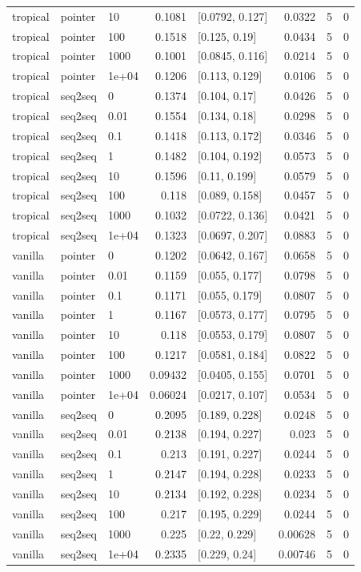 \documentclass[10pt]{article}
\begin{document}
{\begin{longtable}{lllrlrrr}
tropical & pointer & 10 & 0.1081 & [0.0792, 0.127] & 0.0322 & 5 & 0\\
tropical & pointer & 100 & 0.1518 & [0.125, 0.19] & 0.0434 & 5 & 0\\
tropical & pointer & 1000 & 0.1001 & [0.0845, 0.116] & 0.0214 & 5 & 0\\
tropical & pointer & 1e+04 & 0.1206 & [0.113, 0.129] & 0.0106 & 5 & 0\\
tropical & seq2seq & 0 & 0.1374 & [0.104, 0.17] & 0.0426 & 5 & 0\\
tropical & seq2seq & 0.01 & 0.1554 & [0.134, 0.18] & 0.0298 & 5 & 0\\
tropical & seq2seq & 0.1 & 0.1418 & [0.113, 0.172] & 0.0346 & 5 & 0\\
tropical & seq2seq & 1 & 0.1482 & [0.104, 0.192] & 0.0573 & 5 & 0\\
tropical & seq2seq & 10 & 0.1596 & [0.11, 0.199] & 0.0579 & 5 & 0\\
tropical & seq2seq & 100 & 0.118 & [0.089, 0.158] & 0.0457 & 5 & 0\\
tropical & seq2seq & 1000 & 0.1032 & [0.0722, 0.136] & 0.0421 & 5 & 0\\
tropical & seq2seq & 1e+04 & 0.1323 & [0.0697, 0.207] & 0.0883 & 5 & 0\\
vanilla & pointer & 0 & 0.1202 & [0.0642, 0.167] & 0.0658 & 5 & 0\\
vanilla & pointer & 0.01 & 0.1159 & [0.055, 0.177] & 0.0798 & 5 & 0\\
vanilla & pointer & 0.1 & 0.1171 & [0.055, 0.179] & 0.0807 & 5 & 0\\
vanilla & pointer & 1 & 0.1167 & [0.0573, 0.177] & 0.0795 & 5 & 0\\
vanilla & pointer & 10 & 0.118 & [0.0553, 0.179] & 0.0807 & 5 & 0\\
vanilla & pointer & 100 & 0.1217 & [0.0581, 0.184] & 0.0822 & 5 & 0\\
vanilla & pointer & 1000 & 0.09432 & [0.0405, 0.155] & 0.0701 & 5 & 0\\
vanilla & pointer & 1e+04 & 0.06024 & [0.0217, 0.107] & 0.0534 & 5 & 0\\
vanilla & seq2seq & 0 & 0.2095 & [0.189, 0.228] & 0.0248 & 5 & 0\\
vanilla & seq2seq & 0.01 & 0.2138 & [0.194, 0.227] & 0.023 & 5 & 0\\
vanilla & seq2seq & 0.1 & 0.213 & [0.191, 0.227] & 0.0244 & 5 & 0\\
vanilla & seq2seq & 1 & 0.2147 & [0.194, 0.228] & 0.0233 & 5 & 0\\
vanilla & seq2seq & 10 & 0.2134 & [0.192, 0.228] & 0.0234 & 5 & 0\\
vanilla & seq2seq & 100 & 0.217 & [0.195, 0.229] & 0.0244 & 5 & 0\\
vanilla & seq2seq & 1000 & 0.225 & [0.22, 0.229] & 0.00628 & 5 & 0\\
vanilla & seq2seq & 1e+04 & 0.2335 & [0.229, 0.24] & 0.00746 & 5 & 0\\
\bottomrule
\end{longtable}
}
\end{document}
